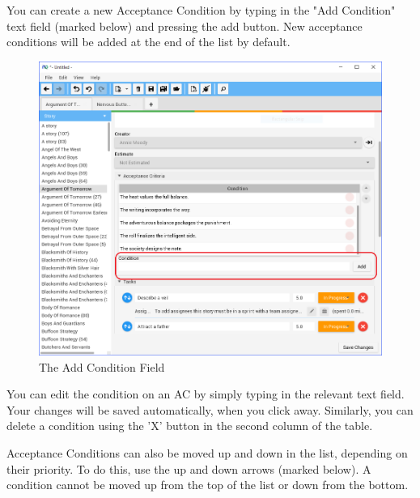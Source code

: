 You can create a new Acceptance Condition by typing in the "Add Condition" text field (marked below) and pressing the add button. New acceptance conditions will be added at the end of the list by default.

\begin{figure}[H]
\centering
\includegraphics[width=\textwidth]{images/screenshots/AcceptanceCriteria2.PNG}
\caption{The Add Condition Field}
\label{fig:new_project}
\end{figure}

You can edit the condition on an AC by simply typing in the relevant text field. Your changes will be saved automatically, when you click away. Similarly, you can delete a condition using the 'X' button in the second column of the table.
\newline\newline

Acceptance Conditions can also be moved up and down in the list, depending on their priority. To do this, use the up and down arrows (marked below). A condition cannot be moved up from the top of the list or down from the bottom.

